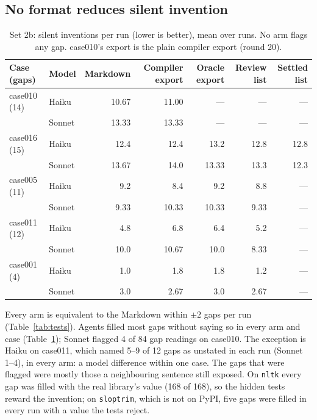 \documentclass{article}
\newcommand{\code}[1]{\texttt{#1}}
\begin{document}
\subsection{No format reduces silent invention}\label{sec:silent}

\begin{table}[t]
\caption{Set 2b: silent inventions per run (lower is better), mean over runs. No arm flags any gap.
case010's export is the plain compiler export (round 20).}
\label{tab:silent}
\centering\small
\begin{tabular}{llrrrrr}
\toprule
Case (gaps) & Model & Markdown & Compiler export & Oracle export & Review list & Settled list \\
\midrule
case010 (14) & Haiku  & 10.67 & 11.00 & --- & --- & --- \\
             & Sonnet & 13.33 & 13.33 & --- & --- & --- \\
case016 (15) & Haiku  & 12.4 & 12.4 & 13.2 & 12.8 & 12.8 \\
             & Sonnet & 13.67 & 14.0 & 13.33 & 13.3 & 12.3 \\
case005 (11) & Haiku  & 9.2 & 8.4 & 9.2 & 8.8 & --- \\
             & Sonnet & 9.33 & 10.33 & 10.33 & 9.33 & --- \\
case011 (12) & Haiku  & 4.8 & 6.8 & 6.4 & 5.2 & --- \\
             & Sonnet & 10.0 & 10.67 & 10.0 & 8.33 & --- \\
case001 (4)  & Haiku  & 1.0 & 1.8 & 1.8 & 1.2 & --- \\
             & Sonnet & 3.0 & 2.67 & 3.0 & 2.67 & --- \\
\bottomrule
\end{tabular}
\end{table}

Every arm is equivalent to the Markdown within $\pm 2$ gaps per run (Table~\ref{tab:tests}). Agents filled
most gaps without saying so in every arm and case (Table~\ref{tab:silent}); Sonnet flagged 4 of 84 gap
readings on case010. The exception is Haiku on case011, which named 5--9 of 12 gaps as unstated in each run
(Sonnet 1--4), in every arm: a model difference within one case. The gaps that were flagged were mostly
those a neighbouring sentence still exposed. On \code{nltk} every gap was filled with the real library's
value (168 of 168), so the hidden tests reward the invention; on \code{sloptrim}, which is not on PyPI, five
gaps were filled in every run with a value the tests reject.
\end{document}
